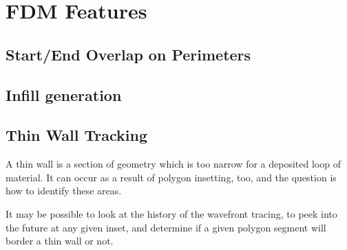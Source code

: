 \documentclass[12pt,a4paper,oneside,openany]{article}
\begin{document}
\section{FDM Features}

\subsection{Start/End Overlap on Perimeters}

\subsection{Infill generation}

\subsection{Thin Wall Tracking}

A thin wall is a section of geometry which is too narrow for a deposited loop of material. It can occur as a result of polygon insetting, too, and the question is how to identify these areas.

It may be possible to look at the history of the wavefront tracing, to peek into the future at any given inset, and determine if a given polygon segment will border a thin wall or not.




\end{document}
